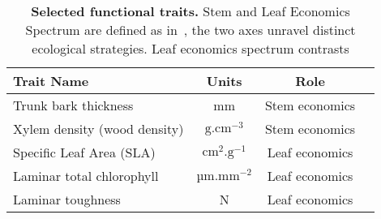 \begin{table}
	\begin{center}
		\begin{tabular}{lccc}
		\hline \hline
		Trait Name & Units & Role \\
		\hline
		Trunk bark thickness & mm & Stem economics \\
		Xylem density (wood density) & $\text{g}.\text{cm}^{-3}$ & Stem economics \\
		Specific Leaf Area (SLA) & $\text{cm}^2.\text{g}^{-1}$ & Leaf economics \\
		Laminar total chlorophyll & $\text{µm}.\text{mm}^{-2}$  & Leaf economics \\
		Laminar toughness & N & Leaf economics \\
		\hline \hline
		\end{tabular}
		\caption{\textbf{Selected functional traits.} Stem and Leaf Economics Spectrum are defined as in~\citep{baraloto_decoupled_2010}, the two axes unravel distinct ecological strategies. Leaf economics spectrum contrasts} 
		\label{tab:seltraits}
	\end{center}
\end{table}
